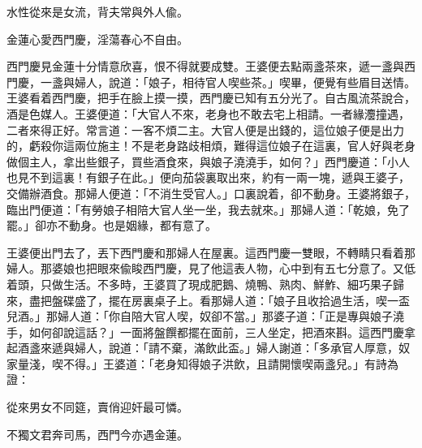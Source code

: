\begin{myquote}
水性從來是女流，背夫常與外人偸。

金蓮心愛西門慶，淫蕩春心不自由。
\end{myquote}

西門慶見金蓮十分情意欣喜，恨不得就要成雙。王婆便去點兩盞茶來，遞一盞與西門慶，一盞與婦人，說道：「娘子，相待官人喫些茶。」喫畢，便覺有些眉目送情。王婆看着西門慶，把手在臉上摸一摸，西門慶已知有五分光了。自古風流茶說合，酒是色媒人。王婆便道：「大官人不來，老身也不敢去宅上相請。一者緣灋撞遇，二者來得正好。常言道：一客不煩二主。大官人便是出錢的，這位娘子便是出力的，虧殺你這兩位施主！不是老身路歧相煩，難得這位娘子在這裏，官人好與老身做個主人，拿出些銀子，買些酒食來，與娘子澆澆手，如何？」西門慶道：「小人也見不到這裏！有銀子在此。」便向茄袋裏取出來，約有一兩一塊，遞與王婆子，交備辦酒食。那婦人便道：「不消生受官人。」口裏說着，卻不動身。王婆將銀子，臨出門便道：「有勞娘子相陪大官人坐一坐，我去就來。」那婦人道：「乾娘，免了罷。」卻亦不動身。也是姻緣，都有意了。

王婆便出門去了，丟下西門慶和那婦人在屋裏。這西門慶一雙眼，不轉睛只看着那婦人。那婆娘也把眼來偸睃西門慶，見了他這表人物，心中到有五七分意了。又低着頭，只做生活。不多時，王婆買了現成肥鵝、燒鴨、熟肉、鮮鮓、細巧果子歸來，盡把盤碟盛了，擺在房裏桌子上。看那婦人道：「娘子且收拾過生活，喫一盃兒酒。」那婦人道：「你自陪大官人喫，奴卻不當。」那婆子道：「正是專與娘子澆手，如何卻說這話？」一面將盤饌都擺在面前，三人坐定，把酒來斟。這西門慶拿起酒盞來遞與婦人，說道：「請不棄，滿飲此盃。」婦人謝道：「多承官人厚意，奴家量淺，喫不得。」王婆道：「老身知得娘子洪飲，且請開懷喫兩盞兒。」有詩為證：

\begin{myquote}
從來男女不同筵，賣俏迎奸最可憐。

不獨文君奔司馬，西門今亦遇金蓮。
\end{myquote}

